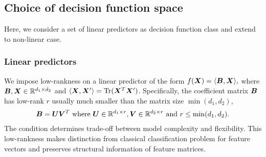 \documentclass[12pt]{article}
\begin{document}
\subsection{Choice of decision function space}\label{sec:fcn class}

Here, we consider a set of linear predictors as decision function class and extend to non-linear case.
\subsubsection{Linear predictors}\label{subsec:linear class}
 We impose low-rankness on a linear predictor of the form $f(\bm X) = \langle \bm B,\bm X\rangle,$
where $\bm B,\bm X\in\mathbb{R}^{d_1\times d_2}$ and $\langle \bm X,\bm X'\rangle = \text{Tr}(\bm X^T\bm X')$.
Specifically,  the coefficient matrix $\bm B$ has low-rank $r$  usually much smaller than the matrix size  $\min(d_1,d_2)$,
\begin{align}\label{eq:lowrank}
\bm B = \bm{U}\bm{V}^T \text{ where } \bm{U} \in\mathbb{R}^{d_1\times r} ,\bm{V}\in\mathbb{R}^{d_2\times r}\text{ and } r\leq\min(d_1,d_2).
\end{align}
The condition determines trade-off between model complexity and flexibility.  This low-rankness makes distinction from classical classification problem for feature vectors and preserves structural information of feature matrices.
\end{document}
